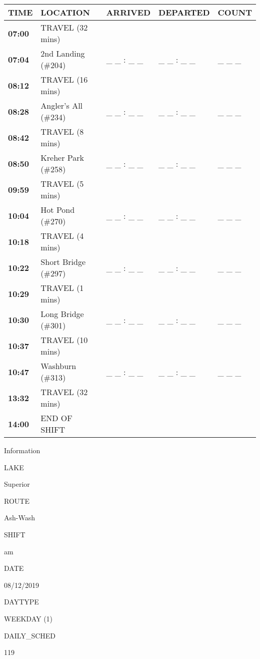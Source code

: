 \documentclass[]{article}
\begin{document}
\begin{tabular}{>{\bfseries}lllll}
\toprule
\textbf{TIME} & \textbf{LOCATION} & \textbf{ARRIVED} & \textbf{DEPARTED} & \textbf{COUNT}\\
\midrule
07:00 & TRAVEL (32 mins) &  &  & \\
07:04 & 2nd Landing (\#204) & \_ \_ : \_ \_ & \_ \_ : \_ \_ & \_ \_ \_\\
08:12 & TRAVEL (16 mins) &  &  & \\
08:28 & Angler's All (\#234) & \_ \_ : \_ \_ & \_ \_ : \_ \_ & \_ \_ \_\\
08:42 & TRAVEL (8 mins) &  &  & \\
08:50 & Kreher Park (\#258) & \_ \_ : \_ \_ & \_ \_ : \_ \_ & \_ \_ \_\\
09:59 & TRAVEL (5 mins) &  &  & \\
10:04 & Hot Pond (\#270) & \_ \_ : \_ \_ & \_ \_ : \_ \_ & \_ \_ \_\\
10:18 & TRAVEL (4 mins) &  &  & \\
10:22 & Short Bridge (\#297) & \_ \_ : \_ \_ & \_ \_ : \_ \_ & \_ \_ \_\\
10:29 & TRAVEL (1 mins) &  &  & \\
10:30 & Long Bridge (\#301) & \_ \_ : \_ \_ & \_ \_ : \_ \_ & \_ \_ \_\\
10:37 & TRAVEL (10 mins) &  &  & \\
10:47 & Washburn (\#313) & \_ \_ : \_ \_ & \_ \_ : \_ \_ & \_ \_ \_\\
13:32 & TRAVEL (32 mins) &  &  & \\
14:00 & END OF SHIFT &  &  & \\
\bottomrule
\end{tabular}\newpage

Information

LAKE

Superior

ROUTE

Ash-Wash

SHIFT

am

DATE

08/12/2019

DAYTYPE

WEEKDAY (1)

DAILY\_SCHED

119

\vspace{24pt}
\end{document}
